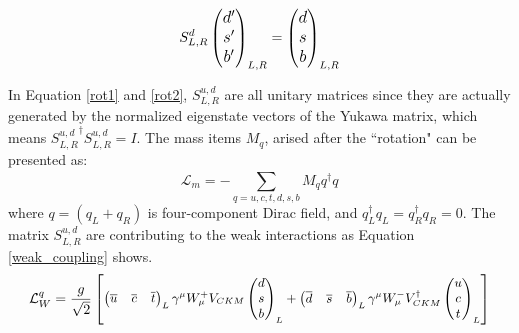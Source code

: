\begin{equation}\label{rot2}
\large
S_{L,R}^{d}
\begin{pmatrix}
d^\prime   \\
s^\prime  \\
b^\prime 
\end{pmatrix}_{L,R}
= \begin{pmatrix}
d  \\
s  \\
b 
\end{pmatrix}_{L,R}
\end{equation}


 In Equation \ref{rot1} and \ref{rot2}, $S^{u,d}_{L,R}$ are all unitary matrices since they are actually generated by the normalized eigenstate vectors of the Yukawa matrix, which means ${S_{L,R}^{u,d}}^\dag S_{L,R}^{u,d} = I$. The mass
  items $M_q$, arised after the ``rotation" can be presented as: 
\begin{equation}
\mathcal{L}_{m} = -\sum_{q=u,c,t,d,s,b}^{} M_q q^{\dag}_{} q_{}
\end{equation}
where $q=(q_L+q_R)$ is four-component Dirac field, and $q_L^\dag q_L = q_R^\dag q_R = 0$. The matrix $S^{u,d}_{L,R}$ are contributing to the weak interactions as Equation \ref{weak_coupling} shows.
\begin{equation}\label{weak_coupling}
\small
\mathcal{L}^q_W = \frac{g}{\sqrt{2}}
\begin{bmatrix}
\begin{pmatrix}
\overline{u}&\overline{c}&\overline{t}
\end{pmatrix}_L

\gamma^\mu W^{+}_{\mu}
V_{CKM}
\begin{pmatrix}
d\\s\\b\\
\end{pmatrix}_L+
\begin{pmatrix}
\overline{d}&\overline{s}&\overline{b}
\end{pmatrix}_L
\gamma^\mu W^{-}_{\mu}
V_{CKM}^{\dag}
\begin{pmatrix}
u\\c\\t\\
\end{pmatrix}_L
\end{bmatrix}
\end{equation}

